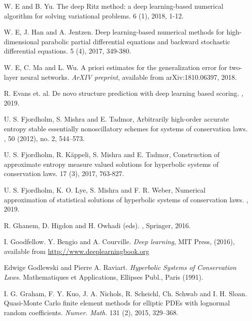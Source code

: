 \documentclass[a4paper]{article}
\numberwithin{equation}{section}
\numberwithin{equation}{section}
\theoremstyle{definition}
\theoremstyle{myremarkstyle}
\begin{document}
\begin{thebibliography}{99}
W. E and B. Yu.
\newblock The deep Ritz method: a deep learning-based numerical algorithm for solving variational problems.
 6 (1), 2018, 1-12.

W. E, J. Han and A. Jentzen.
\newblock Deep learning-based numerical methods for high-dimensional parabolic partial differential equations and backward stochastic differential
equations.
 5 (4), 2017, 349-380.

W. E, C. Ma and L. Wu.
\newblock A priori estimates for the generalization error for two-layer neural networks.
 {\em ArXIV preprint}, available from  arXiv:1810.06397, 2018. 




R. Evans et. al.
\newblock De novo structure prediction with deep learning based scoring.
, 2019.


U. S. Fjordholm, S. Mishra and E. Tadmor,
\newblock Arbitrarily high-order accurate entropy stable essentially nonoscillatory schemes for systems of conservation laws. 
, 50 (2012), no. 2, 544–573.

 U. S. Fjordholm, R. K\"appeli, S. Mishra and E. Tadmor, 
 \newblock Construction of approximate entropy measure valued solutions for hyperbolic systems of conservation laws. 
  17 (3), 2017, 763-827. 


 U. S. Fjordholm, K. O. Lye, S. Mishra and F. R. Weber, 
 \newblock Numerical approximation of statistical solutions of hyperbolic systems of conservation laws.
 , 2019. 

R. Ghanem, D. Higdon and H. Owhadi (eds).
, Springer, 2016.

I. Goodfellow. Y. Bengio and A. Courville.
\newblock \emph{Deep learning},
\newblock MIT Press, (2016), available from \url{http://www.deeplearningbook.org}

 Edwige Godlewski and Pierre A. Raviart.
\newblock \emph{Hyperbolic Systems of Conservation Laws.}
\newblock Mathematiques et Applications, Ellipses Publ., Paris (1991).

I. G. Graham, F. Y. Kuo, J. A. Nichols, R. Scheichl, Ch. Schwab and I. H. Sloan.
\newblock Quasi-Monte Carlo finite element methods for elliptic PDEs with lognormal random coefficients.
{\em  Numer. Math.} 131 (2), 2015, 329–368.


\end{thebibliography}
\end{document}
